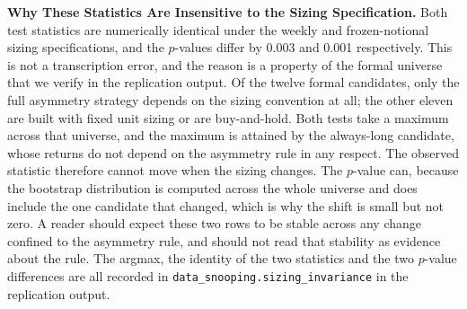 \documentclass[11pt]{article}
\begin{document}
\textbf{Why These Statistics Are Insensitive to the Sizing Specification.} Both test statistics are numerically identical under the weekly and frozen-notional sizing specifications, and the $p$-values differ by 0.003 and 0.001 respectively. This is not a transcription error, and the reason is a property of the formal universe that we verify in the replication output. Of the twelve formal candidates, only the full asymmetry strategy depends on the sizing convention at all; the other eleven are built with fixed unit sizing or are buy-and-hold. Both tests take a maximum across that universe, and the maximum is attained by the always-long candidate, whose returns do not depend on the asymmetry rule in any respect. The observed statistic therefore cannot move when the sizing changes. The $p$-value can, because the bootstrap distribution is computed across the whole universe and does include the one candidate that changed, which is why the shift is small but not zero. A reader should expect these two rows to be stable across any change confined to the asymmetry rule, and should not read that stability as evidence about the rule. The argmax, the identity of the two statistics and the two $p$-value differences are all recorded in \texttt{data\_snooping.sizing\_invariance} in the replication output.
\end{document}
